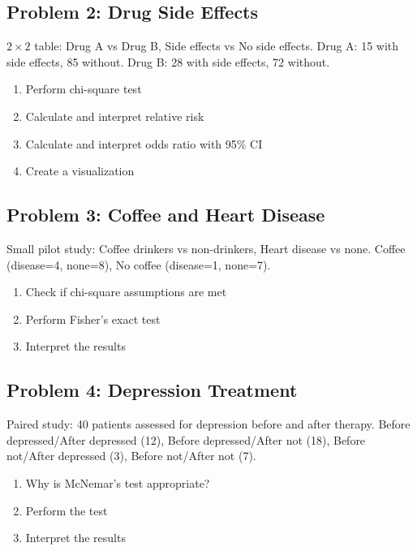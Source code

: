 \documentclass[11pt]{article}
\begin{document}
\vspace{2cm}

\subsection{Problem 2: Drug Side Effects}

$2 \times 2$ table: Drug A vs Drug B, Side effects vs No side effects. Drug A: 15 with side effects, 85 without. Drug B: 28 with side effects, 72 without.

\begin{enumerate}[label=\alph*)]
\item Perform chi-square test
\item Calculate and interpret relative risk
\item Calculate and interpret odds ratio with 95\% CI
\item Create a visualization
\end{enumerate}

\vspace{2cm}

\subsection{Problem 3: Coffee and Heart Disease}

Small pilot study: Coffee drinkers vs non-drinkers, Heart disease vs none. Coffee (disease=4, none=8), No coffee (disease=1, none=7).

\begin{enumerate}[label=\alph*)]
\item Check if chi-square assumptions are met
\item Perform Fisher's exact test
\item Interpret the results
\end{enumerate}

\vspace{2cm}

\subsection{Problem 4: Depression Treatment}

Paired study: 40 patients assessed for depression before and after therapy. Before depressed/After depressed (12), Before depressed/After not (18), Before not/After depressed (3), Before not/After not (7).

\begin{enumerate}[label=\alph*)]
\item Why is McNemar's test appropriate?
\item Perform the test
\item Interpret the results
\end{enumerate}
\end{document}
